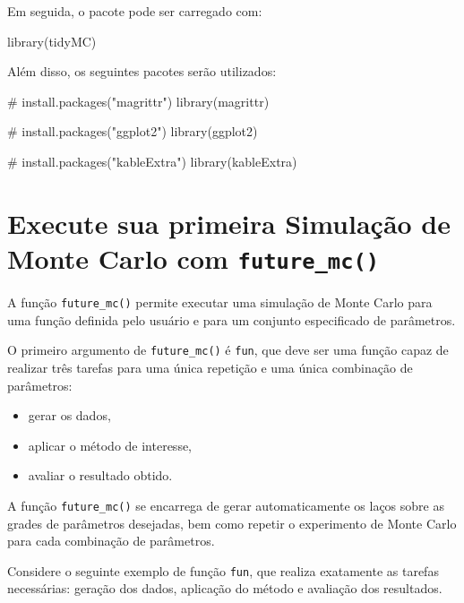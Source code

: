 \documentclass[
  letterpaper,
  DIV=11,
  numbers=noendperiod]{scrreprt}
\newenvironment{Shaded}{\begin{snugshade}}{\end{snugshade}}
\newcommand{\CommentTok}[1]{\textcolor[rgb]{0.37,0.37,0.37}{#1}}
\newcommand{\FunctionTok}[1]{\textcolor[rgb]{0.28,0.35,0.67}{#1}}
\newcommand{\NormalTok}[1]{\textcolor[rgb]{0.00,0.23,0.31}{#1}}
\begin{document}
Em seguida, o pacote pode ser carregado com:

\begin{Shaded}
\begin{Highlighting}[]
\FunctionTok{library}\NormalTok{(tidyMC)}
\end{Highlighting}
\end{Shaded}

Além disso, os seguintes pacotes serão utilizados:

\begin{Shaded}
\begin{Highlighting}[]
\CommentTok{\# install.packages("magrittr")}
\FunctionTok{library}\NormalTok{(magrittr)}

\CommentTok{\# install.packages("ggplot2")}
\FunctionTok{library}\NormalTok{(ggplot2)}

\CommentTok{\# install.packages("kableExtra")}
\FunctionTok{library}\NormalTok{(kableExtra)}
\end{Highlighting}
\end{Shaded}

\section{\texorpdfstring{Execute sua primeira Simulação de Monte Carlo
com
\texttt{future\_mc()}}{Execute sua primeira Simulação de Monte Carlo com future\_mc()}}\label{execute-sua-primeira-simulauxe7uxe3o-de-monte-carlo-com-future_mc}

A função \texttt{future\_mc()} permite executar uma simulação de Monte
Carlo para uma função definida pelo usuário e para um conjunto
especificado de parâmetros.

O primeiro argumento de \texttt{future\_mc()} é \texttt{fun}, que deve
ser uma função capaz de realizar três tarefas para uma única repetição e
uma única combinação de parâmetros:

\begin{itemize}
\item
  gerar os dados,
\item
  aplicar o método de interesse,
\item
  avaliar o resultado obtido.
\end{itemize}

A função \texttt{future\_mc()} se encarrega de gerar automaticamente os
laços sobre as grades de parâmetros desejadas, bem como repetir o
experimento de Monte Carlo para cada combinação de parâmetros.

Considere o seguinte exemplo de função \texttt{fun}, que realiza
exatamente as tarefas necessárias: geração dos dados, aplicação do
método e avaliação dos resultados.
\end{document}
